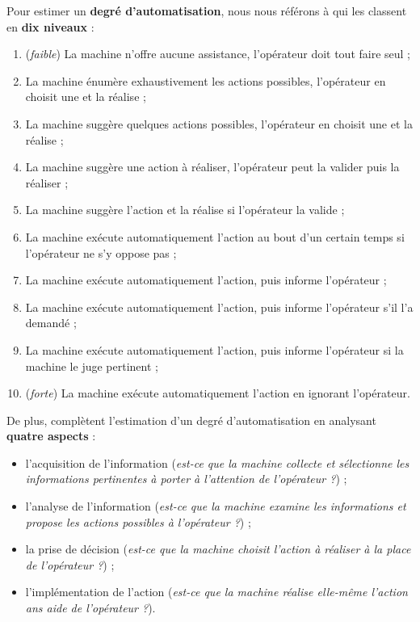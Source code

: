 		\begin{leftBarAuthorOpinion}
			Pour estimer un \textbf{degré d'automatisation}, nous nous référons à \cite{sheridan-verplank:1978:human-computer-control} qui les classent en \textbf{dix niveaux} :
			\begin{enumerate}
				\item (\textit{faible}) La machine n'offre aucune assistance, l'opérateur doit tout faire seul ;
				\item La machine énumère exhaustivement les actions possibles, l'opérateur en choisit une et la réalise ;
				\item La machine suggère quelques actions possibles, l'opérateur en choisit une et la réalise ;
				\item La machine suggère une action à réaliser, l'opérateur peut la valider puis la réaliser ;
				\item La machine suggère l'action et la réalise si l'opérateur la valide ;
				\item La machine exécute automatiquement l'action au bout d'un certain temps si l'opérateur ne s'y oppose pas ;
				\item La machine exécute automatiquement l'action, puis informe l'opérateur ;
				\item La machine exécute automatiquement l'action, puis informe l'opérateur s'il l'a demandé ;
				\item La machine exécute automatiquement l'action, puis informe l'opérateur si la machine le juge pertinent ;
				\item (\textit{forte}) La machine exécute automatiquement l'action en ignorant l'opérateur.
			\end{enumerate}
			
			De plus, \cite{parasuraman-etal:2000:model-types-levels} complètent l'estimation d'un degré d'automatisation en analysant \textbf{quatre aspects} :
			\begin{itemize}
				\item l'acquisition de l'information (\textit{est-ce que la machine collecte et sélectionne les informations pertinentes à porter à l'attention de l'opérateur ?}) ;
				\item l'analyse de l'information (\textit{est-ce que la machine examine les informations et propose les actions possibles à l'opérateur ?}) ;
				\item la prise de décision (\textit{est-ce que la machine choisit l'action à réaliser à la place de l'opérateur ?}) ;
				\item l'implémentation de l'action (\textit{est-ce que la machine réalise elle-même l'action ans aide de l'opérateur ?}).
			\end{itemize}
		\end{leftBarAuthorOpinion}
			
